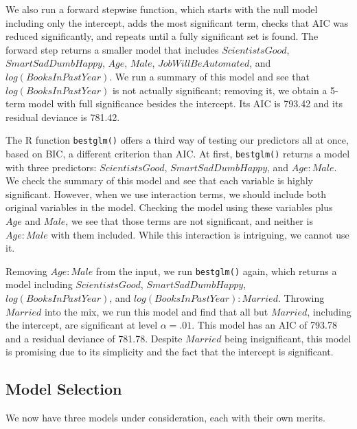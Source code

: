 \par \bigskip We also run a forward stepwise function, which starts with the null model including only the intercept, adds the most significant term, checks that AIC was reduced significantly, and repeats until a fully significant set is found. The forward step returns a smaller model that includes $ScientistsGood$, $SmartSadDumbHappy$, $Age$, $Male$, $JobWillBeAutomated$, and $log(BooksInPastYear)$. We run a summary of this model and see that $log(BooksInPastYear)$ is not actually significant; removing it, we obtain a 5-term model with full significance besides the intercept. Its AIC is 793.42 and its residual deviance is 781.42. 

\par \bigskip The R function \texttt{bestglm()} offers a third way of testing our predictors all at once, based on BIC, a different criterion than AIC. At first, \texttt{bestglm()} returns a model with three predictors: $ScientistsGood$, $SmartSadDumbHappy$, and $Age:Male$. We check the summary of this model and see that each variable is highly significant. However, when we use interaction terms, we should include both original variables in the model. Checking the model using these variables plus $Age$ and $Male$, we see that those terms are not significant, and neither is $Age:Male$ with them included. While this interaction is intriguing, we cannot use it.

\par \bigskip Removing $Age:Male$ from the input, we run \texttt{bestglm()} again, which returns a model including $ScientistsGood$, $SmartSadDumbHappy$, $log(BooksInPastYear)$, and $log(BooksInPastYear):Married$. Throwing $Married$ into the mix, we run this model and find that all but $Married$, including the intercept, are significant at level $\alpha = .01$. This model has an AIC of 793.78 and a residual deviance of 781.78. Despite $Married$ being insignificant, this model is promising due to its simplicity and the fact that the intercept is significant.

\subsection{Model Selection}

We now have three models under consideration, each with their own merits.

